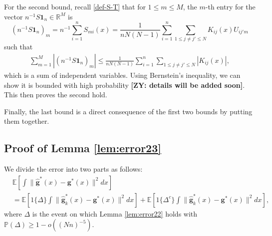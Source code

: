 \documentclass[preprint,11pt]{article}
\newcommand{\mbb}{\mathbb}
\newcommand{\zy}[1]{{\color{red}\bf[ZY: #1]}}
\numberwithin{equation}{section}
\newcommand{\beq}{\begin{equation}}
\newcommand{\eeq}{\end{equation}}
\begin{document}
For the second bound, recall \eqref{def-S-T} that for $1\le m\le M$, the $m$-th entry for the vector $n^{-1}S\bm{1}_n\in\mbb{R}^M$ is
\beq 
(n^{-1}S\bm{1}_n)_m=n^{-1}\sum_{i=1}^n S_{mi}(x) = \frac{1}{nN(N-1)}\sum_{i=1}^n \sum_{1\leq j\neq j'\leq N} K_{ij}(x) U_{ij'm}
\eeq
such that 
\begin{align*}
    \sum_{m=1}^M|(n^{-1}S\bm{1}_n)_m|\le \frac{1}{nN(N-1)}\sum_{i=1}^n \sum_{1\leq j\neq j'\leq N} |K_{ij}(x)|,
\end{align*}
which is a sum of independent variables. Using Bernstein's inequality, we can show it is bounded with high probability \zy{details will be added soon}. This then proves the second hold.

Finally, the last bound is a direct consequence of the first two bounds by putting them together.
\fi

\subsection{Proof of Lemma \ref{lem:error23}}
We divide the error into two parts as follows:
\begin{align*}
    &\mbb{E}\left[\int \|\bm{\widehat{g}}^*(x)-\bm{g}^*(x)\|^2dx\right]\\
    &=\mbb{E}\left[1\{\Delta\}\int \|\bm{\widehat{g}}_k^*(x)-\bm{g}^*(x)\|^2dx\right]+\mbb{E}\left[1\{\Delta^c\}\int \|\bm{\widehat{g}}_k^*(x)-\bm{g}^*(x)\|^2dx\right],
\end{align*}
where $\Delta$ is the event on which Lemma \ref{lem:error22} holds with $\mbb{P}(\Delta)\ge 1-o((Nn)^{-5})$.
\end{document}
